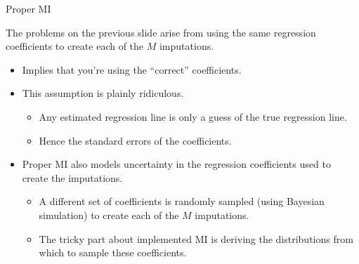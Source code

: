 \documentclass{beamer}\usepackage[]{graphicx}\usepackage[]{color}
\begin{document}
\begin{frame}{Proper MI}
  
  The problems on the previous slide arise from using the same regression 
  coefficients to create each of the $M$ imputations.
  \begin{itemize}
  \item Implies that you're using the ``correct'' coefficients.
    \vb
  \item This assumption is plainly ridiculous.
    \begin{itemize}
    \item Any estimated regression line is only a guess of the true regression
      line.
      \vc
    \item Hence the standard errors of the coefficients.
    \end{itemize}
    \vb
    \pause
  \item Proper MI also models uncertainty in the regression coefficients used to 
    create the imputations.
    \begin{itemize}
    \item A different set of coefficients is randomly sampled (using Bayesian 
      simulation) to create each of the $M$ imputations.
      \vc
    \item The tricky part about implemented MI is deriving the distributions 
      from which to sample these coefficients.
    \end{itemize}
  \end{itemize}
  
\end{frame}

\watermarkoff %
\end{document}
